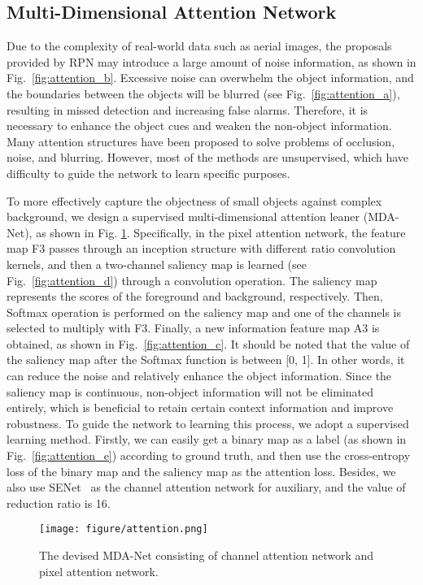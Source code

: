 \documentclass[10pt,twocolumn,letterpaper]{article}
\begin{document}
	\subsection{Multi-Dimensional Attention Network}\label{subsec:mdan}
	Due to the complexity of real-world data such as aerial images, the proposals provided by RPN may introduce a large amount of noise information, as shown in Fig.~\ref{fig:attention_b}. Excessive noise can overwhelm the object information, and the boundaries between the objects will be blurred (see Fig.~\ref{fig:attention_a}), resulting in missed detection and increasing false alarms. Therefore, it is necessary to enhance the object cues and weaken the non-object information. Many attention structures \cite{hu2017squeeze,hu2018relation,wang2017face,Wang2017Non} have been proposed to solve problems of occlusion, noise, and blurring. However, most of the methods are unsupervised, which have difficulty to guide the network to learn specific purposes.
	
	To more effectively capture the objectness of small objects against complex background, we design a supervised multi-dimensional attention leaner (MDA-Net), as shown in Fig. \ref{fig:attention}. Specifically, in the pixel attention network, the feature map F3 passes through an inception structure with different ratio convolution kernels, and then a two-channel saliency map is learned (see Fig.~\ref{fig:attention_d}) through a convolution operation. The saliency map represents the scores of the foreground and background, respectively. Then, Softmax operation is performed on the saliency map and one of the channels is selected to multiply with F3. Finally, a new information feature map A3 is obtained, as shown in Fig.~\ref{fig:attention_c}. It should be noted that the value of the saliency map after the Softmax function is between [0, 1]. In other words, it can reduce the noise and relatively enhance the object information. Since the saliency map is continuous, non-object information will not be eliminated entirely, which is beneficial to retain certain context information and improve robustness. To guide the network to learning this process, we adopt a supervised learning method. Firstly, we can easily get a binary map as a label (as shown in Fig.~\ref{fig:attention_e}) according to ground truth, and then use the cross-entropy loss of the binary map and the saliency map as the attention loss. Besides, we also use SENet~\cite{hu2017squeeze} as the channel attention network for auxiliary, and the value of reduction ratio is 16.
	\begin{figure}[!tb]	
		\centering
\texttt{[image: figure/attention.png]}
		\vspace{-10pt}
		\caption{The devised MDA-Net consisting of channel attention network and pixel attention network.}
		\label{fig:attention}
	\end{figure}
	
\end{document}
